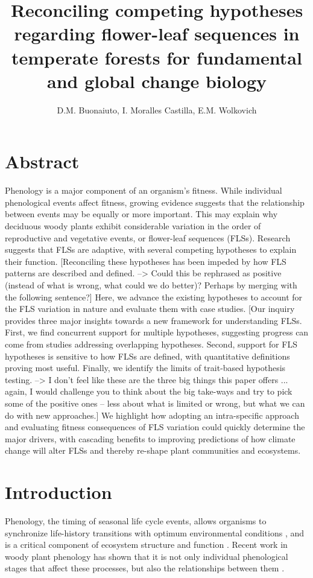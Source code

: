 \documentclass{article}
\title{Reconciling competing hypotheses regarding flower-leaf sequences in temperate forests for fundamental and global change biology}
\author{D.M. Buonaiuto, I. Moralles Castilla, E.M. Wolkovich}
\begin{document}
\maketitle
\section*{Abstract}
Phenology is a major component of an organism's fitness. While individual phenological events affect fitness, growing evidence suggests that the relationship between events may be equally or more important. This may explain why deciduous woody plants exhibit considerable variation in the order of reproductive and vegetative events, or flower-leaf sequences (FLSs). Research suggests that FLSs are adaptive, with several competing hypotheses to explain their function. [Reconciling these hypotheses has been impeded by how FLS patterns are described and defined. --> Could this be rephrased as positive (instead of what is wrong, what could we do better)? Perhaps by merging with the following sentence?] Here, we advance the existing hypotheses to account for the FLS variation in nature and evaluate them with case studies. [Our inquiry provides three major insights towards a new framework for understanding FLSs. First, we find concurrent support for multiple hypotheses, suggesting progress can come from studies addressing overlapping hypotheses. Second, support for FLS hypotheses is sensitive to how FLSs are defined, with quantitative definitions proving most useful. Finally, we identify the limits of trait-based hypothesis testing. --> I don't feel like these are the three big things this paper offers ... again, I would challenge you to think about the big take-ways and try to pick some of the positive ones -- less about what is limited or wrong, but what we can do with new approaches.] We highlight how adopting an intra-specific approach and evaluating fitness consequences of FLS variation could quickly determine the major drivers, with cascading benefits to improving predictions of how climate change will alter FLSs and thereby re-shape plant communities and ecosystems.

\section*{Introduction}
Phenology, the timing of seasonal life cycle events, allows organisms to synchronize life-history transitions with optimum environmental conditions \citep{Forrest2010}, and is a critical component of ecosystem structure and function \citep{Cleland2007,Piao2007}. Recent work in woody plant phenology has shown that it is not only individual phenological stages that affect these processes, but also the relationships between them \citep{Ettinger2018}.\\
\end{document}
